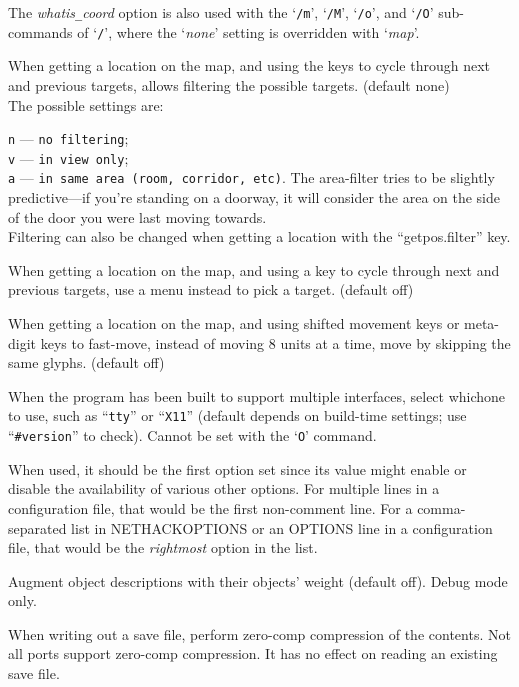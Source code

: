 The
{\it whatis\verb+_+coord\/}
option is also used with
the `{\tt /m}', `{\tt /M}', `{\tt /o}', and `{\tt /O}' sub-commands
of `{\tt /}',
where the `{\it none\/}' setting is overridden with `{\it map}'.
\item[\ib{whatis\verb+_+filter}]
When getting a location on the map, and using the keys to cycle through
next and previous targets, allows filtering the possible targets.
(default none)\\
The possible settings are:

{\tt n} --- \verb#no filtering#;\\
{\tt v} --- \verb#in view only#;\\
{\tt a} --- \verb#in same area (room, corridor, etc)#.
The area-filter tries to be slightly
predictive---if
you're standing on a doorway, it will consider the area on the side of
the door you were last moving towards.\\
Filtering can also be changed when getting a location with
the ``getpos.filter'' key.
\item[\ib{whatis\verb+_+menu}]
When getting a location on the map, and using a key to cycle through
next and previous targets, use a menu instead to pick a target.
(default off)
\item[\ib{whatis\verb+_+moveskip}]
When getting a location on the map, and using shifted movement keys or
meta-digit keys to fast-move, instead of moving 8 units at a time,
move by skipping the same glyphs.
(default off)
\item[\ib{windowtype}]
When the program has been built to support multiple interfaces,
select whichone to use, such as ``{\tt tty}'' or ``{\tt X11}''
(default depends on build-time settings; use ``{\tt \#version}'' to check).
Cannot be set with the `{\tt O}' command.

When used, it should be the first option set since its value might
enable or disable the availability of various other options.
For multiple lines in a configuration file, that would be the first
non-comment line.
For a comma-separated list in NETHACKOPTIONS or an OPTIONS line in a
configuration file, that would be the {\it rightmost\/} option in the list.
\item[\ib{wizweight}]
Augment object descriptions with their objects' weight (default off).
Debug mode only.
\item[\ib{zerocomp}]
When writing out a save file, perform zero-comp compression of the
contents. Not all ports support zero-comp compression. It has no effect
on reading an existing save file.
\elist

